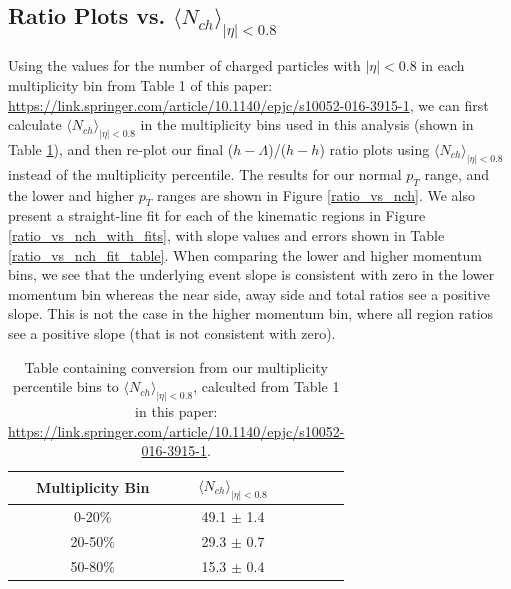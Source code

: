 \documentclass[ALICE,manyauthors]{ALICE_analysis_notes}
\begin{document}
\clearpage

\subsection{Ratio Plots vs. $\langle N_{ch} \rangle_{|\eta| < 0.8}$}

Using the values for the number of charged particles with $|\eta| < 0.8$ in each multiplicity bin from Table 1 of this paper: \url{https://link.springer.com/article/10.1140/epjc/s10052-016-3915-1}, we can first calculate $\langle N_{ch} \rangle_{|\eta| < 0.8}$ in the multiplicity bins used in this analysis (shown in Table \ref{mult_to_nch}), and then re-plot our final ($h-\Lambda$)/($h-h$) ratio plots using $\langle N_{ch} \rangle_{|\eta| < 0.8}$ instead of the multiplicity percentile. The results for our normal $p_{T}$ range, and the lower and higher $p_{T}$ ranges are shown in Figure \ref{ratio_vs_nch}. We also present a straight-line fit for each of the kinematic regions in Figure \ref{ratio_vs_nch_with_fits}, with slope values and errors shown in Table \ref{ratio_vs_nch_fit_table}. When comparing the lower and higher momentum bins, we see that the underlying event slope is consistent with zero in the lower momentum bin whereas the near side, away side and total ratios see a positive slope. This is not the case in the higher momentum bin, where all region ratios see a positive slope (that is not consistent with zero).

\begin{table}[h!]
\centering
\begin{tabular}{| c | c | c | c | c | }
\hline
Multiplicity Bin & $\langle N_{ch} \rangle_{|\eta| < 0.8}$ \\
\hline
0-20\% & 49.1 $\pm$ 1.4 \\
20-50\% & 29.3 $\pm$ 0.7 \\
50-80\% & 15.3 $\pm$ 0.4 \\
\hline
\end{tabular}
\caption{Table containing conversion from our multiplicity percentile bins to $\langle N_{ch} \rangle_{|\eta| < 0.8}$, calculted from Table 1 in this paper: \url{https://link.springer.com/article/10.1140/epjc/s10052-016-3915-1}.}
\label{mult_to_nch}
\end{table}
\end{document}
